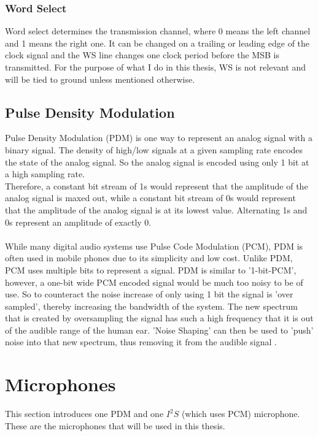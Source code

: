 \subsubsection{Word Select}

Word select determines the transmission channel, where 0 means the left channel and 1 means the right one.
It can be changed on a trailing or leading edge of the clock signal and the WS line changes one clock period
before the MSB is transmitted.
For the purpose of what I do in this thesis, WS is not relevant and will be tied to ground unless mentioned otherwise.

\subsection{Pulse Density Modulation}

Pulse Density Modulation (PDM) is one way to represent an analog signal with a binary signal.
The density of high/low signals at a given sampling rate encodes the state of the analog signal.
So the analog signal is encoded using only 1 bit at a high sampling rate.\\
Therefore, a constant bit stream of 1s would represent that the amplitude of the analog signal is maxed out,
while a constant bit stream of 0s would represent that the amplitude of the analog signal is at its lowest value.
Alternating 1s and 0s represent an amplitude of exactly 0.\\\\
While many digital audio systems use Pulse Code Modulation (PCM),
PDM is often used in mobile phones \cite{pdm_utexas} due to its simplicity and low cost. Unlike PDM, PCM uses multiple bits to represent a signal.
PDM is similar to '1-bit-PCM', however, a one-bit wide PCM encoded signal would be much too noisy to be of use.
So to counteract the noise increase of only using 1 bit the signal is 'over sampled', thereby increasing the bandwidth of the system.
The new spectrum that is created by oversampling the signal has such a high frequency that it is out of the audible range of the human ear.
'Noise Shaping' can then be used to 'push' noise into that new spectrum, thus removing it from the audible signal \cite{pdm_texas}.

\section{Microphones}

This section introduces one PDM and one $I^2S$ (which uses PCM) microphone.
These are the microphones that will be used in this thesis.

